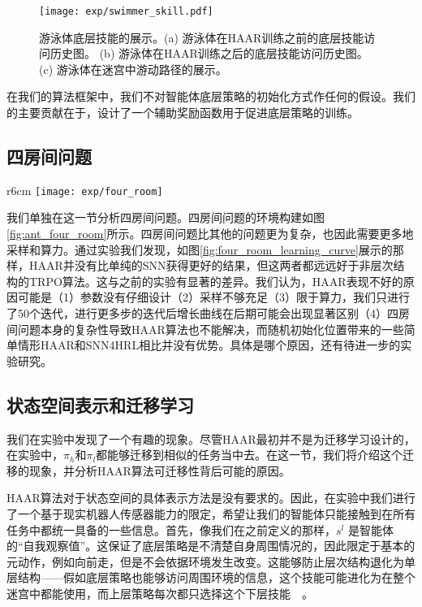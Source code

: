 \begin{figure}[htbp]
    \centering
    \texttt{[image: exp/swimmer\_skill.pdf]}
    \caption{游泳体底层技能的展示。(a) 游泳体在HAAR训练之前的底层技能访问历史图。 (b) 游泳体在HAAR训练之后的底层技能访问历史图。 (c) 游泳体在迷宫中游动路径的展示。 }
    \label{fig:swimmer_skill}
\end{figure}

在我们的算法框架中，我们不对智能体底层策略的初始化方式作任何的假设。我们的主要贡献在于，设计了一个辅助奖励函数用于促进底层策略的训练。

\subsection{四房间问题}

\begin{wrapfigure}{r}{6cm}
\texttt{[image: exp/four\_room]}
\setlength{\belowcaptionskip}{-1.0cm}
\caption{四房间问题当中，HAAR算法和SNN4HRL算法的对比，没有显著差异。}
\label{fig:four_room_learning_curve}
\end{wrapfigure}

我们单独在这一节分析四房间问题。四房间问题的环境构建如图\ref{fig:ant_four_room}所示。四房间问题比其他的问题更为复杂，也因此需要更多地采样和算力。通过实验我们发现，如图\ref{fig:four_room_learning_curve}展示的那样，HAAR并没有比单纯的SNN获得更好的结果，但这两者都远远好于非层次结构的TRPO算法。这与之前的实验有显著的差异。我们认为，HAAR表现不好的原因可能是（1）参数没有仔细设计（2）采样不够充足（3）限于算力，我们只进行了50个迭代，进行更多步的迭代后增长曲线在后期可能会出现显著区别（4）四房间问题本身的复杂性导致HAAR算法也不能解决，而随机初始化位置带来的一些简单情形HAAR和SNN4HRL相比并没有优势。具体是哪个原因，还有待进一步的实验研究。

\subsection{状态空间表示和迁移学习}\label{sec:transfer}
我们在实验中发现了一个有趣的现象。尽管HAAR最初并不是为迁移学习设计的，在实验中，$\pi_h$和$\pi_l$都能够迁移到相似的任务当中去。在这一节，我们将介绍这个迁移的现象，并分析HAAR算法可迁移性背后可能的原因。

HAAR算法对于状态空间的具体表示方法是没有要求的。因此，在实验中我们进行了一个基于现实机器人传感器能力的限定，希望让我们的智能体只能接触到在所有任务中都统一具备的一些信息。首先，像我们在之前定义的那样，$s^l$ 是智能体的``自我观察值''。这保证了底层策略是不清楚自身周围情况的，因此限定于基本的元动作，例如向前走，但是不会依据环境发生改变。这能够防止层次结构退化为单层结构——假如底层策略也能够访问周围环境的信息，这个技能可能进化为在整个迷宫中都能使用，而上层策略每次都只选择这个下层技能~\cite{feudal}~\cite{option-critic}。

